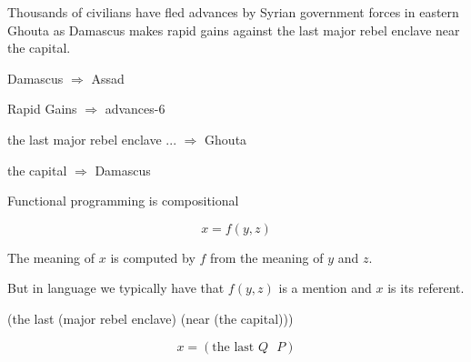 {

{\color{blue} Thousands of civilians have fled advances by Syrian government forces in eastern Ghouta as}
Damascus makes rapid gains against the last major rebel enclave near the capital.

\vfill
Damascus $\Rightarrow$ Assad

\vfill
Rapid Gains $\Rightarrow$ advances-6

\vfill
the last major rebel enclave ... $\Rightarrow$ Ghouta

\vfill
the capital $\Rightarrow$ Damascus


Functional programming is compositional

\vfill
$$x = f(y,z)$$

\vfill
The meaning of $x$ is computed by $f$ from the meaning of $y$ and $z$.

\vfill
But in language we typically have that $f(y,z)$ is a mention and $x$ is its referent.

\vfill
(the last (major rebel enclave) (near (the capital)))

\vfill
$$x = (\mbox{the last $Q$ $P$})$$


}

